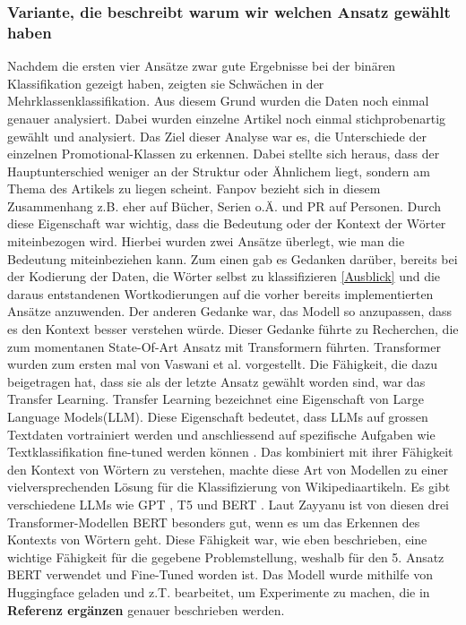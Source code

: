 \subsubsection{Variante, die beschreibt warum wir welchen Ansatz gewählt haben}
Nachdem die ersten vier Ansätze zwar gute Ergebnisse bei der binären Klassifikation gezeigt haben, zeigten sie Schwächen in der Mehrklassenklassifikation. Aus diesem Grund wurden die Daten noch einmal genauer analysiert. Dabei wurden einzelne Artikel noch einmal stichprobenartig gewählt und analysiert. Das Ziel dieser Analyse war es, die Unterschiede der einzelnen Promotional-Klassen zu erkennen. Dabei stellte sich heraus, dass der Hauptunterschied weniger an der Struktur oder Ähnlichem liegt, sondern am Thema des Artikels zu liegen scheint. Fanpov bezieht sich in diesem Zusammenhang z.B. eher auf Bücher, Serien o.Ä. und PR auf Personen. Durch diese Eigenschaft war wichtig, dass die Bedeutung oder der Kontext der Wörter miteinbezogen wird. Hierbei wurden zwei Ansätze überlegt, wie man die Bedeutung miteinbeziehen kann. Zum einen gab es Gedanken darüber, bereits bei der Kodierung der Daten, die Wörter selbst zu klassifizieren \ref{Ausblick} und die daraus entstandenen Wortkodierungen auf die vorher bereits implementierten Ansätze anzuwenden. Der anderen Gedanke war, das Modell so anzupassen, dass es den Kontext besser verstehen würde. Dieser Gedanke führte zu Recherchen, die zum momentanen State-Of-Art Ansatz mit Transformern führten. Transformer wurden zum ersten mal von Vaswani et al. \cite{Attention} vorgestellt. Die Fähigkeit, die dazu beigetragen hat, dass sie als der letzte Ansatz gewählt worden sind, war das Transfer Learning. Transfer Learning bezeichnet eine Eigenschaft von Large Language Models(LLM).
Diese Eigenschaft bedeutet, dass LLMs auf grossen Textdaten vortrainiert werden und anschliessend auf spezifische Aufgaben wie Textklassifikation fine-tuned werden können \cite{9783960108535}. Das kombiniert mit ihrer Fähigkeit den Kontext von Wörtern zu verstehen, machte diese Art von Modellen zu einer vielversprechenden Lösung für die Klassifizierung von Wikipediaartikeln. Es gibt verschiedene LLMs wie GPT \cite{yenduri2023generativepretrainedtransformercomprehensive}, T5 \cite{DBLP:journals/corr/abs-1910-10683} und BERT \cite{BERTReference}. Laut Zayyanu \cite{article_comparing_LLMs} ist von diesen drei Transformer-Modellen BERT besonders gut, wenn es um das Erkennen des Kontexts von Wörtern geht. Diese Fähigkeit war, wie eben beschrieben, eine wichtige Fähigkeit für die gegebene Problemstellung, weshalb für den 5. Ansatz BERT verwendet und Fine-Tuned worden ist. Das Modell wurde mithilfe von Huggingface \cite{huggingfaceQuelle} geladen und z.T. bearbeitet, um Experimente zu machen, die in \textbf{Referenz ergänzen} genauer beschrieben werden.

